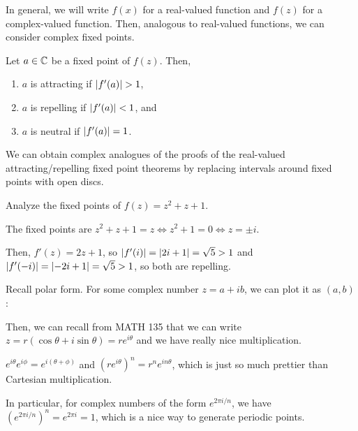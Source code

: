 \documentclass[class=pmath370,tikz,notes]{agony}
\begin{document}
In general, we will write $f(x)$ for a real-valued function and $f(z)$ for a complex-valued function.
Then, analogous to real-valued functions, we can consider complex fixed points.

\begin{defn*}
  Let $a \in \mathbb{C}$ be a fixed point of $f(z)$. Then,
  \begin{enumerate}[nosep]
    \item $a$ is attracting if $\abs{f'(a)} > 1$,
    \item $a$ is repelling if $\abs{f'(a)} < 1$, and
    \item $a$ is neutral if $\abs{f'(a)} = 1$.
  \end{enumerate}
\end{defn*}

\begin{remark}
  We can obtain complex analogues of the proofs of the
  real-valued attracting/repelling fixed point theorems
  by replacing intervals around fixed points with open discs.
\end{remark}

\begin{example}
  Analyze the fixed points of $f(z) = z^2 + z + 1$.
\end{example}
\begin{sol}
  The fixed points are $z^2 + z + 1 = z \iff z^2 + 1 = 0 \iff z = \pm i$.

  Then, $f'(z) = 2z + 1$, so $\abs{f'(i)} = \abs{2i+1} = \sqrt5 > 1$
  and $\abs{f'(-i)} = \abs{-2i+1} = \sqrt5 > 1$,
  so both are repelling.
\end{sol}

Recall polar form.
For some complex number $z = a + ib$, we can plot it as $(a,b)$:
\begin{center}
\end{center}
Then, we can recall from MATH 135 that we can write $z = r(\cos\theta + i\sin\theta) = re^{i\theta}$
and we have really nice multiplication.
\begin{fact}[PM$\C$, MATH 135]
  $e^{i\theta}e^{i\phi} = e^{i(\theta + \phi)}$ and $(re^{i\theta})^n = r^ne^{in\theta}$,
  which is just so much prettier than Cartesian multiplication.
\end{fact}
In particular, for complex numbers of the form $e^{2\pi i / n}$,
we have $(e^{2\pi i/n})^n = e^{2\pi i} = 1$,
which is a nice way to generate periodic points.
\end{document}
